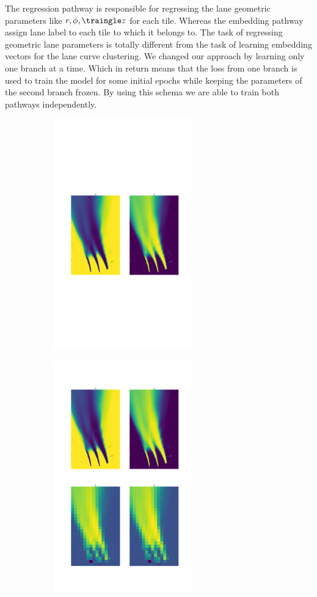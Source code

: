 The regression pathway is responsible for regressing the lane geometric parameters like $r, \phi, \traingle z$ for each tile. Whereas the embedding pathway assign lane label to each tile to which it belongs to. The task of regressing geometric lane parameters is totally different from the task of learning embedding vectors for the lane curve clustering. We changed our approach by learning only one branch at a time. Which in return means that the loss from one branch is used to train the model for some initial epochs while keeping the parameters of the second branch frozen.  By using this schema we are able to train both pathways independently. 

 \begin{figure}[h]
      \caption{Activation maps of convolutional layers (a) embedding pathway (b) regression pathway, while training them independently}
        \centering
        \begin{subfigure}{0.8\textwidth}
        \includegraphics[width=1\linewidth, height=10cm]{images/activation_embedding.png} 
        \caption{}
        \label{fig:subim1}
        \end{subfigure}
        \begin{subfigure}{0.8\textwidth}
        \includegraphics[width=1\linewidth,height=10cm]{images/activation_regression.png}

\end{subfigure}
\end{figure}
